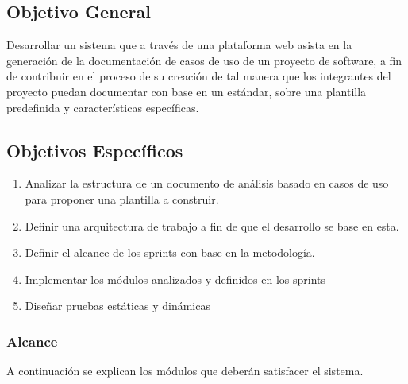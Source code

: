 \subsection{Objetivo General}
Desarrollar un sistema que a través de una plataforma web asista en la generación de la documentación de casos de uso de un proyecto de software, a fin de contribuir en el proceso de su creación de tal manera que los integrantes del proyecto puedan documentar con base en un estándar, sobre una plantilla predefinida y características específicas.

\subsection{Objetivos Específicos}

\begin{enumerate}
	\item Analizar la estructura de un documento de análisis basado en casos de uso para proponer una plantilla a construir.
	\item Definir una arquitectura de trabajo a fin de que el desarrollo se base en esta.
	\item Definir el alcance de los sprints con base en la metodología.
	\item Implementar los módulos analizados y definidos en los sprints
	\item Diseñar pruebas estáticas y dinámicas
\end{enumerate}

\subsubsection{Alcance}

A continuación se explican los módulos que deberán satisfacer el sistema.

